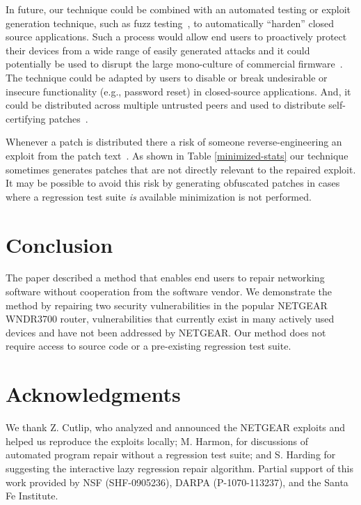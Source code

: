 \documentclass{sigcomm-alternate}
\begin{document}
In future, our technique could be combined with an automated testing or exploit
generation technique, such as fuzz testing~\cite{miller1990empirical},
to automatically ``harden'' closed source applications.  Such a
process would allow end users to proactively protect their
devices from a wide range of easily generated attacks and it could 
potentially be used to disrupt the large mono-culture of commercial
firmware~\cite{ieee-sp-09}.
The technique could be adapted by users to disable or break
undesirable or insecure functionality (e.g., password reset) in
closed-source applications.  And, it could be distributed across
multiple untrusted peers and used to distribute self-certifying
patches~\cite{costa2008vigilante,schulte2013embedded}.


Whenever a patch is distributed there a risk of someone
reverse-engineering an exploit from the patch
text~\cite{brumley2008automatic}.  As shown in Table
\ref{minimized-stats} our technique sometimes generates patches that
are not directly relevant to the repaired exploit.  It may be possible
to avoid this risk by generating obfuscated patches in cases where a
regression test suite \emph{is} available minimization is not
performed.

\section{Conclusion}

The paper described a method that enables end users to repair networking
software without cooperation from the software vendor.  We demonstrate
the method by repairing two security vulnerabilities in the popular
NETGEAR WNDR3700 router, vulnerabilities that currently exist in many
actively used devices and have not been addressed by NETGEAR.  Our
method does not require access to source code or a pre-existing
regression test suite.

\section{Acknowledgments}
\label{sec-7}
We thank Z. Cutlip, who analyzed and announced
the NETGEAR exploits and helped us reproduce the exploits
locally;
M. Harmon, for discussions of automated program repair without a
regression test suite; and S. Harding for suggesting the
interactive lazy regression repair algorithm.  
Partial support of this work provided by NSF (SHF-0905236),
DARPA (P-1070-113237), and the Santa Fe Institute.



\end{document}
